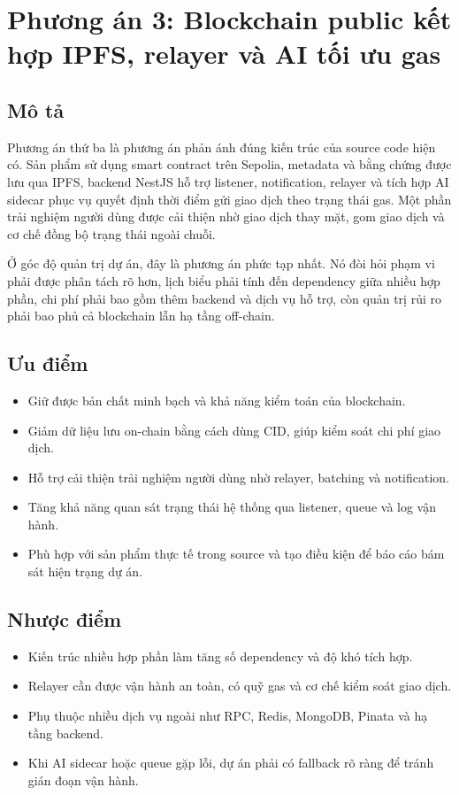 \section{Phương án 3: Blockchain public kết hợp IPFS, relayer và AI tối ưu gas}

\subsection{Mô tả}

Phương án thứ ba là phương án phản ánh đúng kiến trúc của source code hiện có. Sản phẩm sử dụng smart contract trên Sepolia, metadata và bằng chứng được lưu qua IPFS, backend NestJS hỗ trợ listener, notification, relayer và tích hợp AI sidecar phục vụ quyết định thời điểm gửi giao dịch theo trạng thái gas. Một phần trải nghiệm người dùng được cải thiện nhờ giao dịch thay mặt, gom giao dịch và cơ chế đồng bộ trạng thái ngoài chuỗi.

Ở góc độ quản trị dự án, đây là phương án phức tạp nhất. Nó đòi hỏi phạm vi phải được phân tách rõ hơn, lịch biểu phải tính đến dependency giữa nhiều hợp phần, chi phí phải bao gồm thêm backend và dịch vụ hỗ trợ, còn quản trị rủi ro phải bao phủ cả blockchain lẫn hạ tầng off-chain.

\subsection{Ưu điểm}

\begin{itemize}
  \item Giữ được bản chất minh bạch và khả năng kiểm toán của blockchain.
  \item Giảm dữ liệu lưu on-chain bằng cách dùng CID, giúp kiểm soát chi phí giao dịch.
  \item Hỗ trợ cải thiện trải nghiệm người dùng nhờ relayer, batching và notification.
  \item Tăng khả năng quan sát trạng thái hệ thống qua listener, queue và log vận hành.
  \item Phù hợp với sản phẩm thực tế trong source và tạo điều kiện để báo cáo bám sát hiện trạng dự án.
\end{itemize}

\subsection{Nhược điểm}

\begin{itemize}
  \item Kiến trúc nhiều hợp phần làm tăng số dependency và độ khó tích hợp.
  \item Relayer cần được vận hành an toàn, có quỹ gas và cơ chế kiểm soát giao dịch.
  \item Phụ thuộc nhiều dịch vụ ngoài như RPC, Redis, MongoDB, Pinata và hạ tầng backend.
  \item Khi AI sidecar hoặc queue gặp lỗi, dự án phải có fallback rõ ràng để tránh gián đoạn vận hành.
\end{itemize}

